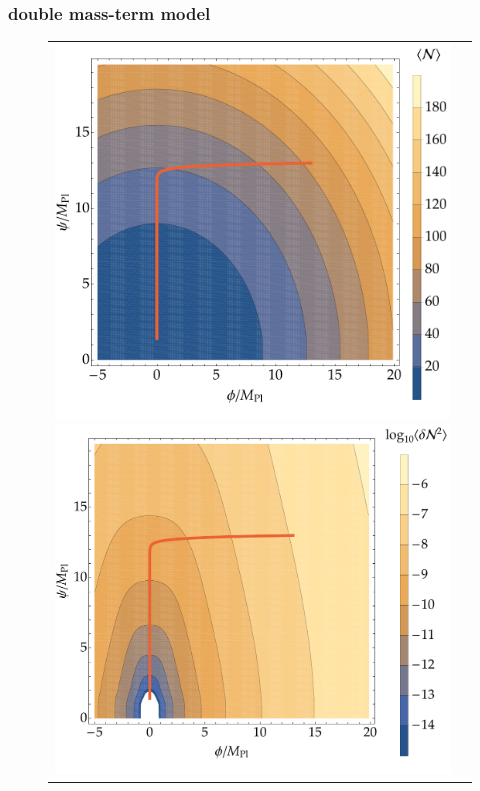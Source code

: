 \documentclass[aps, prd
, preprint
, nofootinbib 
, longbibliography
]{revtex4-1}
\begin{document}
\subsubsection{double mass-term model}

\begin{figure}
	\centering
	\begin{tabular}{cc}
		\begin{minipage}{0.5\hsize}
			\centering
			\includegraphics[width=0.9\hsize]{figs/double_chaotic/N_conf.pdf}
		\end{minipage}
		\begin{minipage}{0.5\hsize}
			\centering
			\includegraphics[width=0.9\hsize]{figs/double_chaotic/dN2_conf.pdf}

\end{minipage}
\end{tabular}
\end{figure}
\end{document}
